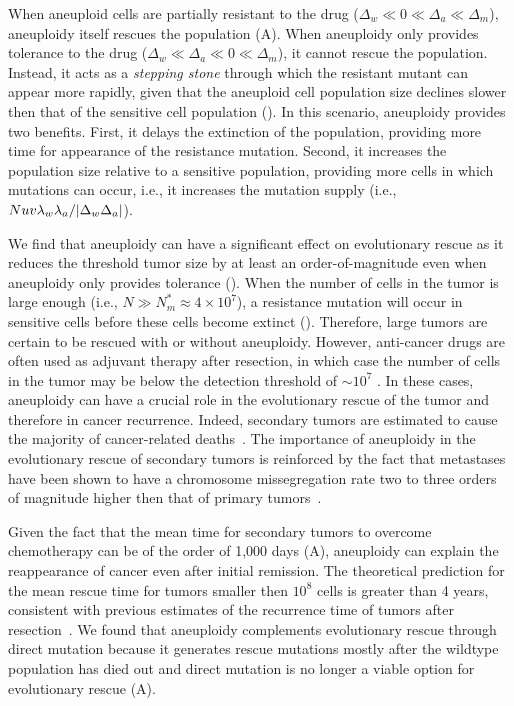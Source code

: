 \documentclass[12pt]{extarticle}
\begin{document}
When aneuploid cells are partially resistant to the drug ($\Delta_w\ll0\ll\Delta_a\ll\Delta_m$), aneuploidy itself rescues the population (A). 
When aneuploidy only provides tolerance to the drug ($\Delta_w\ll\Delta_a\ll0\ll\Delta_m$), it cannot rescue the population.
Instead, it acts as a \emph{stepping stone} through which the resistant mutant can appear more rapidly, given that the aneuploid cell population size declines slower then that of the sensitive cell population (). In this scenario, aneuploidy provides two benefits. First, it delays the extinction of the population, providing more time for appearance of the resistance mutation. Second, it increases the population size relative to a sensitive population, providing more cells in which mutations can occur, i.e., it increases the mutation supply (i.e., $Nuv\lambda_w\lambda_a/\abs{\Delta_w\Delta_a}$).

We find that aneuploidy can have a significant effect on evolutionary rescue as it reduces the threshold tumor size by at least an order-of-magnitude even when aneuploidy only provides tolerance ().
When the number of cells in the tumor is large enough (i.e., $N\gg N_m^*\approx 4\times10^7$), a resistance mutation will occur in sensitive cells before these cells become extinct (). Therefore, large tumors are certain to be rescued with or without aneuploidy.
However, anti-cancer drugs are often used as adjuvant therapy after resection, in which case the number of cells in the tumor may be below the detection threshold of $\sim10^7$  \citep{bozic2013evolutionary}. In these cases, aneuploidy can have a crucial role in the evolutionary rescue of the tumor and therefore in cancer recurrence.
Indeed, secondary tumors are estimated to cause the majority of cancer-related deaths~\citep{chaffer2011perspective}. The importance of aneuploidy in the evolutionary rescue of secondary tumors is reinforced by the fact that metastases have been shown to have a chromosome missegregation rate two to three orders of magnitude higher then that of primary tumors~\citep{kimmel2023intra}.

Given the fact that the mean time for secondary tumors to overcome chemotherapy can be of the order of 1,000 days (A), aneuploidy can explain the reappearance of cancer even after initial remission. The theoretical prediction for the mean rescue time for tumors smaller then  $10^8$ cells is greater than 4 years, consistent with previous estimates of the recurrence time of tumors after resection~\citep{avanzini2019cancer}. We found that aneuploidy complements evolutionary rescue through direct mutation because it generates rescue mutations mostly after the wildtype population has died out and direct mutation is no longer a viable option for evolutionary rescue (A).
\end{document}
